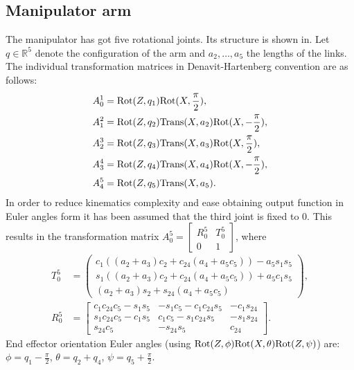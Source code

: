 \subsection{Manipulator arm}
The manipulator has got five rotational joints. Its structure is shown in. %
Let $q\in \mathbb{R}^5$ denote the configuration of the arm and $a_2, \dots, a_5$ the lengths of the links. The individual transformation matrices in Denavit-Hartenberg convention are as follows:
\begin{align}
A_0^1 &= \mathrm{Rot}(Z, q_1)\mathrm{Rot}(X, \frac{\pi}{2}),\\
A_1^2 &= \mathrm{Rot}(Z, q_2)\mathrm{Trans} (X, a_2)\mathrm{Rot}(X, -\frac{\pi}{2}),\\
A_2^3 &= \mathrm{Rot}(Z, q_3)\mathrm{Trans} (X, a_3)\mathrm{Rot}(X, \frac{\pi}{2}),\\
A_3^4 &= \mathrm{Rot}(Z, q_4)\mathrm{Trans} (X, a_4)\mathrm{Rot}(X, -\frac{\pi}{2}),\\
A_4^5 &= \mathrm{Rot}(Z, q_5)\mathrm{Trans} (X, a_5).
\end{align}
In order to reduce kinematics complexity and ease obtaining output function in Euler angles form it has been assumed that the third joint is fixed to $0$. This results in the transformation matrix $
A_0^5=\begin{bmatrix}
R_0^5 & T_0^5\\
0 & 1
\end{bmatrix}$, 
where
\begin{align}
T_0^5 &= \begin{pmatrix}
c_1\left((a_2+a_3)c_2 + c_{24}(a_4+a_5c_5)\right) - a_5s_1s_5\\
s_1\left((a_2+a_3)c_2 + c_{24}(a_4+a_5c_5)\right) + a_5c_1s_5\\
    (a_2+a_3)s_2 + s_{24}(a_4+a_5c_5)
\end{pmatrix},\\
R_0^5 &= \begin{bmatrix}
c_1c_{24}c_5-s_1s_5 & -s_1c_5-c_1c_{24}s_5 & -c_1s_{24}\\
s_1c_{24}c_5-c_1s_5 &  c_1c_5-s_1c_{24}s_5 & -s_1s_{24}\\
s_{24}c_5           & -s_{24}s_5           &  c_{24}
\end{bmatrix}.
\end{align}
End effector orientation Euler angles (using $\mathrm{Rot}(Z,\phi)\mathrm{Rot}(X, \theta)\mathrm{Rot}(Z, \psi)$) are: $\phi=q_1-\frac{\pi}{2}$, $\theta=q_2+q_4$, $\psi=q_5+\frac{\pi}{2}$.

